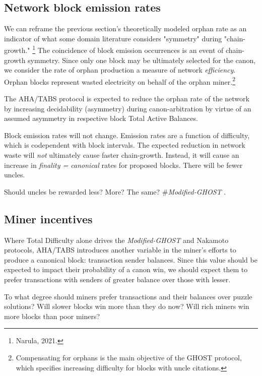 \documentclass[11pt]{article}
\theoremstyle{plain}
\newcommand{\mghost}{\textit{Modified-GHOST }}
\begin{document}
{\subsection{\normalsize{Network block emission rates}}

We can reframe the previous section's theoretically modeled orphan rate
as an indicator of what some domain literature considers "symmetry" during "chain-growth."\nolinebreak
\footnote{Narula, 2021.}
The coincidence of block emission occurrences is an event of chain-growth symmetry.
Since only one block may be ultimately selected for the canon, we consider the rate of orphan production
a measure of network \emph{efficiency}.
Orphan blocks represent wasted electricity on behalf of the orphan miner.\footnote{
    Compensating for orphans is the main objective of the GHOST protocol,
    which specifies increasing difficulty for blocks with uncle citations.
}

The AHA/TABS protocol is expected to reduce the orphan rate of the network by increasing decidability (asymmetry)
during canon-arbitration by virtue of an assumed asymmetry in respective block Total Active Balances.

Block emission rates will not change.
Emission rates are a function of difficulty, which is codependent with block intervals.
The expected reduction in network waste will \emph{not} ultimately cause faster chain-growth.
Instead, it will cause an increase in \emph{finality = canonical} rates for proposed blocks.
There will be fewer uncles.

Should uncles be rewarded less? More? The same? \#\mghost.

\subsection{\normalsize{Miner incentives}}

Where Total Difficulty alone drives the \mghost and Nakamoto protocols,
AHA/TABS introduces another variable in the miner's efforts to produce a canonical block: transaction sender balances.
Since this value should be expected to impact their probability of a canon win, we should expect them
to prefer transactions with senders of greater balance over those with lesser.

To what degree should miners prefer transactions and their balances over puzzle solutions?
Will slower blocks win more than they do now?
Will rich miners win more blocks than poor miners?

}
\end{document}
